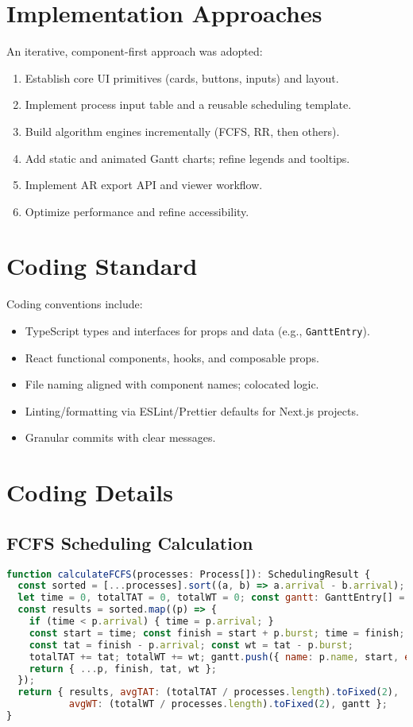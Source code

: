 \documentclass[12pt,a4paper,oneside]{report}
\begin{document}
\section{Implementation Approaches}
An iterative, component-first approach was adopted:
\begin{enumerate}
  \item Establish core UI primitives (cards, buttons, inputs) and layout.
  \item Implement process input table and a reusable scheduling template.
  \item Build algorithm engines incrementally (FCFS, RR, then others).
  \item Add static and animated Gantt charts; refine legends and tooltips.
  \item Implement AR export API and viewer workflow.
  \item Optimize performance and refine accessibility.
\end{enumerate}

\section{Coding Standard}
Coding conventions include:
\begin{itemize}
  \item TypeScript types and interfaces for props and data (e.g., \verb|GanttEntry|).
  \item React functional components, hooks, and composable props.
  \item File naming aligned with component names; colocated logic.
  \item Linting/formatting via ESLint/Prettier defaults for Next.js projects.
  \item Granular commits with clear messages.
\end{itemize}

\section{Coding Details}
\subsection*{FCFS Scheduling Calculation}
\begin{lstlisting}[language=JavaScript, caption={FCFS schedule calculation (excerpt from \texttt{src/app/fcfs/page.tsx}).}]
function calculateFCFS(processes: Process[]): SchedulingResult {
  const sorted = [...processes].sort((a, b) => a.arrival - b.arrival);
  let time = 0, totalTAT = 0, totalWT = 0; const gantt: GanttEntry[] = [];
  const results = sorted.map((p) => {
    if (time < p.arrival) { time = p.arrival; }
    const start = time; const finish = start + p.burst; time = finish;
    const tat = finish - p.arrival; const wt = tat - p.burst;
    totalTAT += tat; totalWT += wt; gantt.push({ name: p.name, start, end: finish });
    return { ...p, finish, tat, wt };
  });
  return { results, avgTAT: (totalTAT / processes.length).toFixed(2),
           avgWT: (totalWT / processes.length).toFixed(2), gantt };
}
\end{lstlisting}
\end{document}
